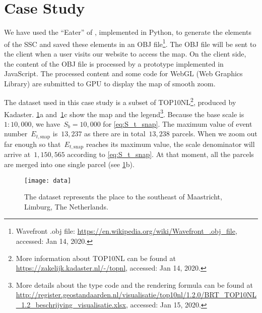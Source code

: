 \documentclass[ijgi,article,submit,moreauthors,pdftex]{Definitions/mdpi}
\begin{document}
\section{Case Study}
\label{sec:case_study}

We have used the ``Eater'' of \citet{Suba2014Merge},
implemented in Python, 
to generate the elements of the SSC \citep{vanOosterom2014tGAPSSC} 
and saved these elements in an OBJ file\footnote{%
Wavefront .obj file:
\url{https://en.wikipedia.org/wiki/Wavefront_.obj_file},
accessed: Jan 14, 2020.}.
%
The OBJ file will be sent to the client 
when a user visits our website to access the map.
On the client side,
the content of the OBJ file is processed
by a prototype implemented in JavaScript.
The processed content and some code for WebGL (Web Graphics Library)
are submitted to GPU to display the map of smooth zoom.

The dataset used in this case study is a subset of TOP10NL\footnote{%
More information about TOP10NL can be found at
\url{https://zakelijk.kadaster.nl/-/topnl},
accessed: Jan 14, 2020.},
produced by Kadaster.
%
\figs\ref{fig:data}a and~\ref{fig:data}c show the map and the legend\footnote{%
More details about the type code and the rendering formula can be found at
\url{http://register.geostandaarden.nl/visualisatie/top10nl/1.2.0/BRT_TOP10NL_1.2_beschrijving_visualisatie.xlsx},
accessed: Jan 15, 2020.}.
%
Because the base scale is $1:10{,}000$, 
we have~$S_b = 10{,}000$ for \eq\ref{eq:S_t_snap}.
The maximum value of event number~$E_{t,\mathrm{snap}}$ is~$13{,}237$
as there are in total~$13{,}238$ parcels.
When we zoom out far enough 
so that~$E_{t,\mathrm{snap}}$ reaches its maximum value,
the scale denominator will arrive at~$1{,}150{,}565$
according to \eq\ref{eq:S_t_snap}.
At that moment, all the parcels are merged into one single parcel
(see \figs\ref{fig:data}b).


\begin{figure}[tb]
\centering
\texttt{[image: data]}
\caption{The dataset represents the place 
    to the southeast of Maastricht, Limburg, The Netherlands.}
\label{fig:data}
\end{figure}
\end{document}
